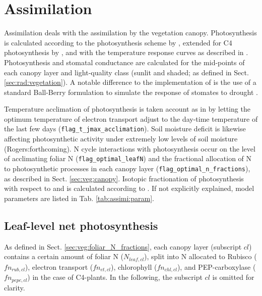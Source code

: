 \chapter{Assimilation}\label{ch:assimi}

Assimilation deals with the  assimilation by the vegetation canopy. Photosynthesis is calculated according to the photosynthesis scheme by \cite{Kull:1998cr}, extended for C4 photosynthesis by \cite{Friend:2009tf}, and with the temperature response curves as described in \cite{Friend:2010je}. Photosynthesis and stomatal conductance are calculated for the mid-points of each canopy layer and light-quality class (sunlit and shaded; as defined in Sect. \ref{sec:rad:vegetation}). A notable difference to the implementation of \cite{Friend:2010je} is the use of a standard Ball-Berry formulation to simulate the response of stomates to drought \cite{Ball:1987uv, Knauer:2015dh}. 

Temperature acclimation of photosynthesis is taken account as in \cite{Friend:2010je} by letting the optimum temperature of electron transport adjust to the day-time temperature of the last few days (\texttt{flag\_t\_jmax\_acclimation}). Soil moisture deficit is likewise affecting photosynthetic activity under extremely low levels of soil moisture (Rogers:forthcoming). N cycle interactions with photosynthesis occur on the level of acclimating foliar N (\texttt{flag\_optimal\_leafN}) and the fractional allocation of N to photosynthetic processes in each canopy layer (\texttt{flag\_optimal\_n\_fractions}), as described in Sect. \ref{sec:veg:canopy}. Isotopic fractionation of photosynthesis with respect to  and  is calculated according to \cite{Farquhar:1982ks,Drake:2014dl}. If not explicitly explained, model parameters are listed in Tab. \ref{tab:assimi:param}.

\section{Leaf-level net photosynthesis}\label{sec:assimi:leaf_ps}

As defined in Sect. \ref{sec:veg:foliar_N_fractions}, each canopy layer (subscript $cl$) contains a certain amount of foliar N ($N_{leaf,cl}$), split into N allocated to Rubisco ($fn_{rub,cl}$), electron transport ($fn_{et,cl}$), chlorophyll ($fn_{chl,cl}$), and PEP-carboxylase ($fn_{pepc,cl}$) in the case of C4-plants. In the following, the subscript $cl$ is omitted for clarity. 

